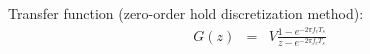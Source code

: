 \medskip
Transfer function (zero-order hold discretization method):
\begin{eqnarray*}
	G(z) &=& V\frac{1-e^{-2 \pi f_c T_s}}{z - e^{-2 \pi f_c T_s}}
\end{eqnarray*}


